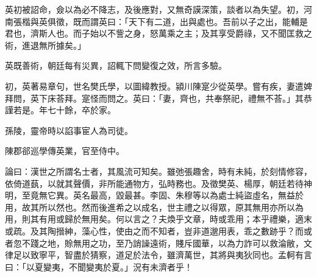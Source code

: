 \begin{pinyinscope}
英初被詔命，僉以為必不降志，及後應對，又無奇謨深策，談者以為失望。初，河南張楷與英俱徵，既而謂英曰：「天下有二道，出與處也。吾前以子之出，能輔是君也，濟斯人也。而子始以不訾之身，怒萬乘之主；及其享受爵祿，又不聞匡救之術，進退無所據矣。」

英既善術，朝廷每有災異，詔輒下問變復之效，所言多驗。

初，英著易章句，世名樊氏學，以圖緯教授。潁川陳寔少從英學。嘗有疾，妻遣婢拜問，英下床荅拜。寔怪而問之。英曰：「妻，齊也，共奉祭祀，禮無不荅。」其恭謹若是。年七十餘，卒於家。

孫陵，靈帝時以諂事宦人為司徒。

陳郡郤巡學傳英業，官至侍中。

論曰：漢世之所謂名士者，其風流可知矣。雖弛張趣舍，時有未純，於刻情修容，依倚道蓺，以就其聲價，非所能通物方，弘時務也。及徵樊英、楊厚，朝廷若待神明，至竟無它異。英名最高，毀最甚。李固、朱穆等以為處士純盜虛名，無益於用，故其所以然也。然而後進希之以成名，世主禮之以得眾，原其無用亦所以為用，則其有用或歸於無用矣。何以言之？夫煥乎文章，時或乖用；本乎禮樂，適末或疏。及其陶搢紳，藻心性，使由之而不知者，豈非道邈用表，乖之數跡乎？而或者忽不踐之地，賒無用之功，至乃誚譟遠術，賤斥國華，以為力詐可以救淪敝，文律足以致寧平，智盡於猜察，道足於法令，雖濟萬世，其將與夷狄同也。孟軻有言曰：「以夏變夷，不聞變夷於夏。」況有未濟者乎！


\end{pinyinscope}
